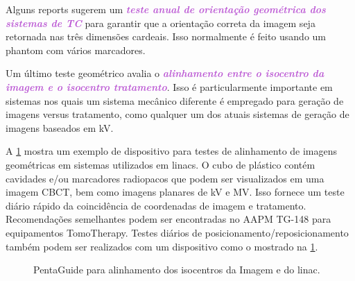\documentclass[11pt,a4paper]{article}
\newcounter{exemplo}
\begin{document}
    Alguns reports sugerem um \textcolor{MediumOrchid}{\textbf{\textit{teste anual de orientação geométrica dos sistemas de TC}}} para garantir que a orientação correta da imagem seja retornada nas três dimensões cardeais. Isso normalmente é feito usando um phantom com vários marcadores. 
    
    Um último teste geométrico avalia o \textcolor{MediumOrchid}{\textbf{\textit{alinhamento entre o isocentro da imagem e o isocentro tratamento}}}. Isso é particularmente importante em sistemas nos quais um sistema mecânico diferente é empregado para geração de imagens versus tratamento, como qualquer um dos atuais sistemas de geração de imagens baseados em kV. 

    A \ref{fig:pentaguide} mostra um exemplo de dispositivo para testes de alinhamento de imagens geométricas em sistemas utilizados em linacs. O cubo de plástico contém cavidades e/ou marcadores radiopacos que podem ser visualizados em uma imagem CBCT, bem como imagens planares de kV e MV. Isso fornece um teste diário rápido da coincidência de coordenadas de imagem e tratamento. Recomendações semelhantes podem ser encontradas no AAPM TG-148 para equipamentos TomoTherapy. Testes diários de posicionamento/reposicionamento também podem ser realizados com um dispositivo como o mostrado na \ref{fig:pentaguide}. 
    
    \begin{figure}
        \centering
        \caption{PentaGuide para alinhamento dos isocentros da Imagem e do linac.}
        \label{fig:pentaguide}
    \end{figure}
    
\end{document}
